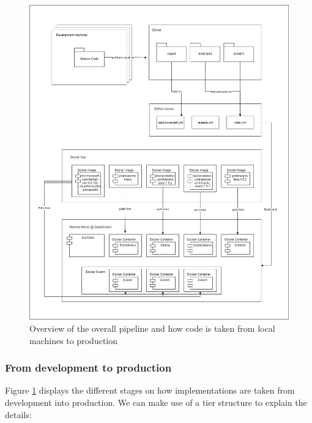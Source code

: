 \documentclass[report/main.tex]{subfiles}
\begin{document}
                \begin{figure}[H]
                    \centering
                        \includegraphics[width=\textwidth]{report/images/EvilTwitter-workflow-final.png}
                        \caption{Overview of the overall pipeline and how code is taken from local machines to production}
                    \label{fig:overall_workflow}
                \end{figure}
                
            \newpage 
            
            \subsubsection{From development to production}
                Figure \ref{fig:overall_workflow} displays the different stages on how implementations are taken from development into production. We can make use of a tier structure to explain the details:
            
\end{document}
